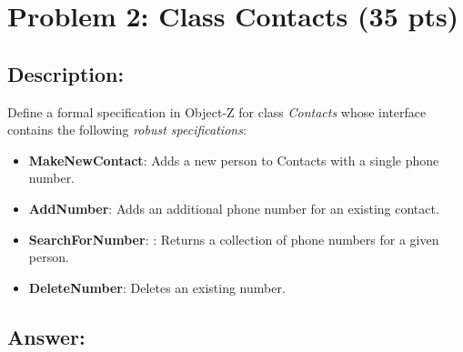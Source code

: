 \newpage
\section{Problem 2: Class Contacts (35 pts)}

\subsection{Description:}
Define a formal specification in Object-Z for class \textit{Contacts} whose interface contains the
following \textit{robust specifications}:

\begin{itemize}
    \item \textbf{MakeNewContact}: Adds a new person to Contacts with a single phone number.
    \item \textbf{AddNumber}: Adds an additional phone number for an existing contact.
    \item \textbf{SearchForNumber}: : Returns a collection of phone numbers for a given person.
    \item \textbf{DeleteNumber}: Deletes an existing number.
\end{itemize}

\subsection{Answer:}

